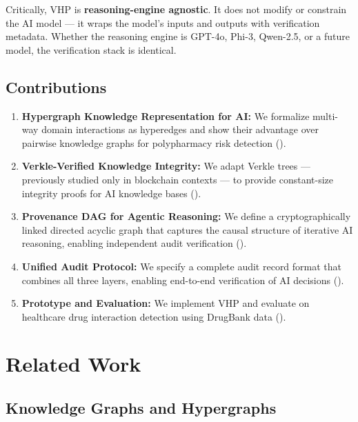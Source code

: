 \documentclass[11pt,a4paper]{article}
\begin{document}
Critically, VHP is \textbf{reasoning-engine agnostic}. It does not modify or constrain the AI model --- it wraps the model's inputs and outputs with verification metadata. Whether the reasoning engine is GPT-4o, Phi-3, Qwen-2.5, or a future model, the verification stack is identical.

\subsection{Contributions}

\begin{enumerate}
    \item \textbf{Hypergraph Knowledge Representation for AI:} We formalize multi-way domain interactions as hyperedges and show their advantage over pairwise knowledge graphs for polypharmacy risk detection ().
    
    \item \textbf{Verkle-Verified Knowledge Integrity:} We adapt Verkle trees \citep{kuszmaul2019verkle} --- previously studied only in blockchain contexts --- to provide constant-size integrity proofs for AI knowledge bases ().
    
    \item \textbf{Provenance DAG for Agentic Reasoning:} We define a cryptographically linked directed acyclic graph that captures the causal structure of iterative AI reasoning, enabling independent audit verification ().
    
    \item \textbf{Unified Audit Protocol:} We specify a complete audit record format that combines all three layers, enabling end-to-end verification of AI decisions ().
    
    \item \textbf{Prototype and Evaluation:} We implement VHP and evaluate on healthcare drug interaction detection using DrugBank data ().
\end{enumerate}

\section{Related Work}
\label{sec:related}

\subsection{Knowledge Graphs and Hypergraphs}
\end{document}

